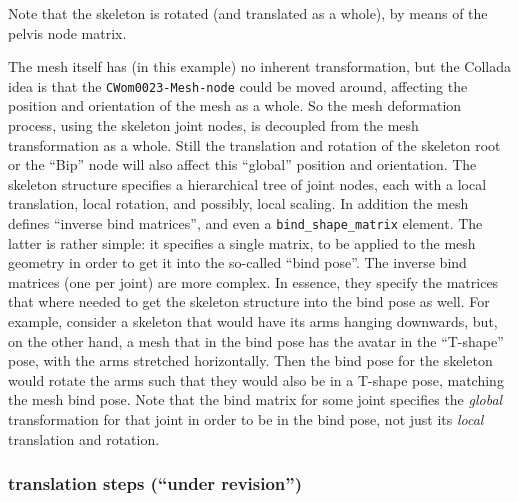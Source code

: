 Note that the skeleton is rotated (and translated as a whole), by means of the pelvis node matrix. 

The mesh itself has (in this example) no inherent transformation, but the Collada idea is that the 
\verb"CWom0023-Mesh-node" could be moved around, affecting the position and orientation of the mesh as a whole. 
So the mesh deformation process, using the skeleton joint nodes, is decoupled from the mesh transformation
as a whole. Still the translation and rotation of the skeleton root or the ``Bip'' node will also
affect this ``global'' position and orientation. 
The skeleton structure specifies a hierarchical tree of joint nodes, each with a local translation, local rotation, and possibly, local scaling. In addition the mesh defines ``inverse bind matrices'', 
and even a \verb"bind_shape_matrix" element. The latter is rather simple: it specifies
a single matrix, to be applied to the mesh geometry in order to get it into 
the so-called ``bind pose''. 
The inverse bind matrices (one per joint) are more complex. 
In essence, they specify the matrices that where needed to get the skeleton structure
into the bind pose as well. For example, consider a skeleton that would have its arms 
hanging downwards, but, on the other hand, a mesh that in the bind pose has the avatar
in the ``T-shape'' pose, with the arms stretched horizontally. 
Then the bind pose for the skeleton would rotate the arms such that they would also be in
a T-shape pose, matching the mesh bind pose. Note that the bind matrix for some joint specifies
the \emph{global} transformation for that joint in order to be in the bind pose, not just
its \emph{local} translation and rotation. 

\subsubsection{ translation steps (``under revision'') }

